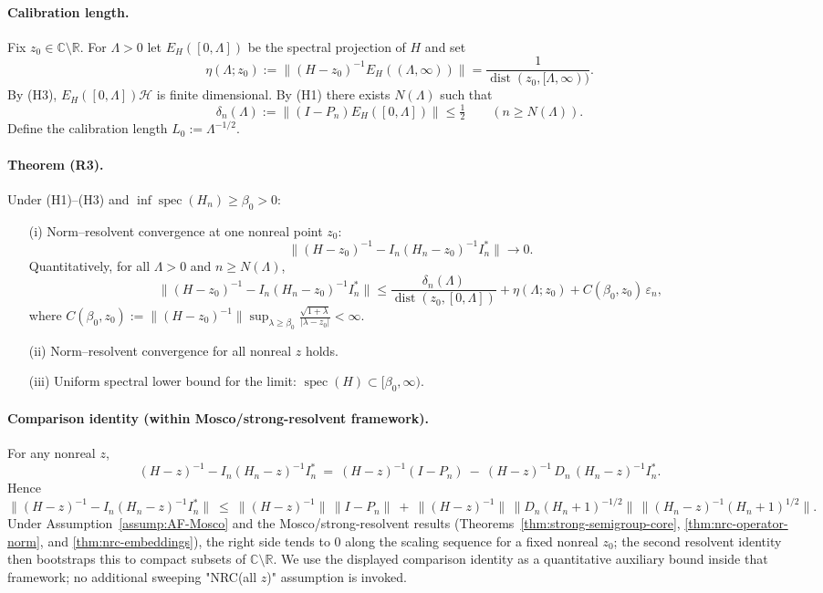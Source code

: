\documentclass[11pt]{amsart}
\theoremstyle{plain}
\theoremstyle{definition}
\theoremstyle{remark}
\begin{document}
\paragraph{Calibration length.}
Fix $z_0\in\mathbb C\setminus\mathbb R$. For $\Lambda>0$ let $E_H([0,\Lambda])$ be the spectral projection of $H$ and set
\[
  \eta(\Lambda;z_0):=\bigl\|(H-z_0)^{-1} E_H((\Lambda,\infty))\bigr\|=\frac{1}{\operatorname{dist}(z_0,[\Lambda,\infty))}.
\]
By (H3), $E_H([0,\Lambda])\mathcal H$ is finite dimensional. By (H1) there exists $N(\Lambda)$ such that
\[
  \delta_n(\Lambda):=\bigl\|(I-P_n) E_H([0,\Lambda])\bigr\|\le \tfrac12\qquad(n\ge N(\Lambda)).
\]
Define the calibration length $L_0:=\Lambda^{-1/2}$.

\paragraph{Theorem (R3).}
Under (H1)–(H3) and $\inf\operatorname{spec}(H_n)\ge \beta_0>0$:
\begin{itemize}
  \item[(i)] Norm–resolvent convergence at one nonreal point $z_0$:
  \[
    \bigl\|(H-z_0)^{-1} - I_n(H_n-z_0)^{-1} I_n^*\bigr\|\to 0.
  \]
  Quantitatively, for all $\Lambda>0$ and $n\ge N(\Lambda)$,
  \[
    \bigl\|(H-z_0)^{-1} - I_n(H_n-z_0)^{-1} I_n^*\bigr\|\le \frac{\delta_n(\Lambda)}{\operatorname{dist}(z_0,[0,\Lambda])}+\eta(\Lambda;z_0)+C(\beta_0,z_0)\,\varepsilon_n,
  \]
  where $C(\beta_0,z_0):=\bigl\|(H-z_0)^{-1}\bigr\|\sup_{\lambda\ge\beta_0} \frac{\sqrt{1+\lambda}}{|\lambda-z_0|}<\infty$.
  \item[(ii)] Norm–resolvent convergence for all nonreal $z$ holds.
  \item[(iii)] Uniform spectral lower bound for the limit: $\operatorname{spec}(H)\subset[\beta_0,\infty)$.
\end{itemize}

\paragraph{Comparison identity (within Mosco/strong-resolvent framework).}
For any nonreal $z$,
\[
  (H-z)^{-1} - I_n(H_n-z)^{-1} I_n^*\ =\ (H-z)^{-1}(I-P_n)\ -\ (H-z)^{-1}\, D_n\,(H_n-z)^{-1} I_n^*.
\]
Hence
\[
  \big\|(H-z)^{-1} - I_n(H_n-z)^{-1} I_n^*\big\|\ \le\ \|(H-z)^{-1}\|\,\|I-P_n\|\ +\ \|(H-z)^{-1}\|\,\|D_n(H_n+1)^{-1/2}\|\,\|(H_n-z)^{-1}(H_n+1)^{1/2}\|.
\]
Under Assumption~\ref{assump:AF-Mosco} and the Mosco/strong-resolvent results (Theorems~\ref{thm:strong-semigroup-core}, \ref{thm:nrc-operator-norm}, and \ref{thm:nrc-embeddings}), the right side tends to $0$ along the scaling sequence for a fixed nonreal $z_0$; the second resolvent identity then bootstraps this to compact subsets of $\mathbb C\setminus\mathbb R$. We use the displayed comparison identity as a quantitative auxiliary bound inside that framework; no additional sweeping "NRC(all $z$)" assumption is invoked.
\end{document}

